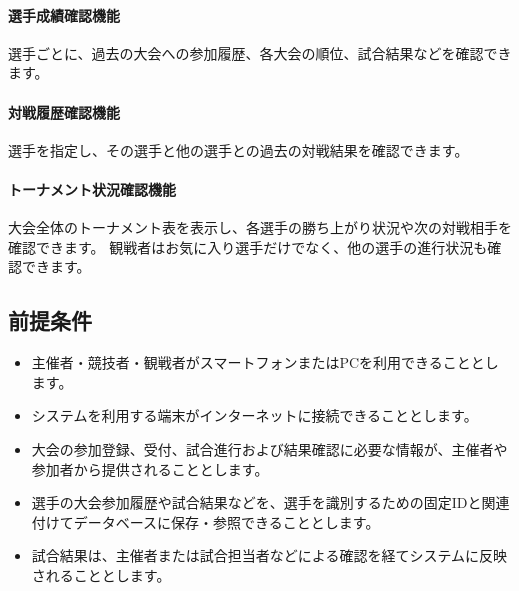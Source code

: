 \paragraph{選手成績確認機能}
選手ごとに、過去の大会への参加履歴、各大会の順位、試合結果などを確認できます。

\paragraph{対戦履歴確認機能}
選手を指定し、その選手と他の選手との過去の対戦結果を確認できます。

\paragraph{トーナメント状況確認機能}
大会全体のトーナメント表を表示し、各選手の勝ち上がり状況や次の対戦相手を確認できます。
観戦者はお気に入り選手だけでなく、他の選手の進行状況も確認できます。

\subsection{前提条件}
\begin{itemize}
  \item 主催者・競技者・観戦者がスマートフォンまたはPCを利用できることとします。
  \item システムを利用する端末がインターネットに接続できることとします。
  \item 大会の参加登録、受付、試合進行および結果確認に必要な情報が、主催者や参加者から提供されることとします。
  \item 選手の大会参加履歴や試合結果などを、選手を識別するための固定IDと関連付けてデータベースに保存・参照できることとします。
  \item 試合結果は、主催者または試合担当者などによる確認を経てシステムに反映されることとします。
\end{itemize}

